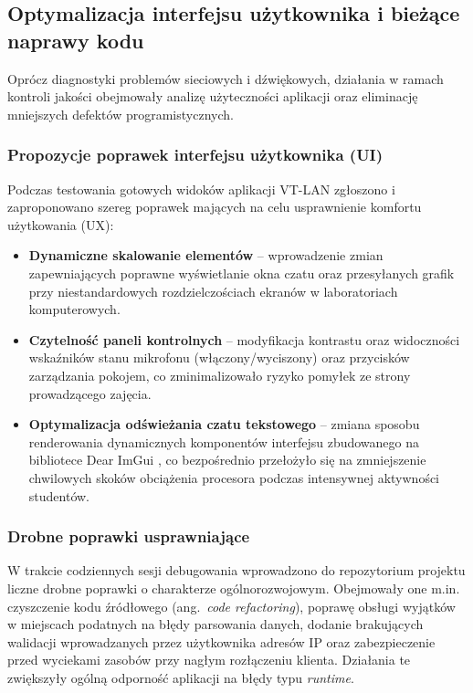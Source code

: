 \subsection{Optymalizacja interfejsu użytkownika i bieżące naprawy kodu}
\label{subsec:db_optymalizacja}

Oprócz diagnostyki problemów sieciowych i dźwiękowych, działania w ramach
kontroli jakości obejmowały analizę użyteczności aplikacji oraz eliminację
mniejszych defektów programistycznych.

\subsubsection{Propozycje poprawek interfejsu użytkownika (UI)}
\label{subsubsec:db_ui}

Podczas testowania gotowych widoków aplikacji VT-LAN zgłoszono i zaproponowano
szereg poprawek mających na celu usprawnienie komfortu użytkowania (UX):

\begin{itemize}
	\item \textbf{Dynamiczne skalowanie elementów} -- wprowadzenie zmian
	zapewniających poprawne wyświetlanie okna czatu oraz przesyłanych
	grafik przy niestandardowych rozdzielczościach ekranów w laboratoriach
	komputerowych.
	\item \textbf{Czytelność paneli kontrolnych} -- modyfikacja kontrastu oraz
	widoczności wskaźników stanu mikrofonu (włączony/wyciszony) oraz
	przycisków zarządzania pokojem, co zminimalizowało ryzyko pomyłek
	ze strony prowadzącego zajęcia.
	\item \textbf{Optymalizacja odświeżania czatu tekstowego} -- zmiana sposobu
	renderowania dynamicznych komponentów interfejsu zbudowanego na
	bibliotece Dear ImGui \cite{ImGui}, co bezpośrednio przełożyło się
	na zmniejszenie chwilowych skoków obciążenia procesora podczas
	intensywnej aktywności studentów.
\end{itemize}

\subsubsection{Drobne poprawki usprawniające}
\label{subsubsec:db_drobne}

W trakcie codziennych sesji debugowania wprowadzono do repozytorium projektu
liczne drobne poprawki o charakterze ogólnorozwojowym. Obejmowały one m.in.
czyszczenie kodu źródłowego (ang.~\textit{code refactoring}), poprawę obsługi
wyjątków w miejscach podatnych na błędy parsowania danych, dodanie brakujących
walidacji wprowadzanych przez użytkownika adresów IP oraz zabezpieczenie przed
wyciekami zasobów przy nagłym rozłączeniu klienta. Działania te zwiększyły
ogólną odporność aplikacji na błędy typu \textit{runtime}.

